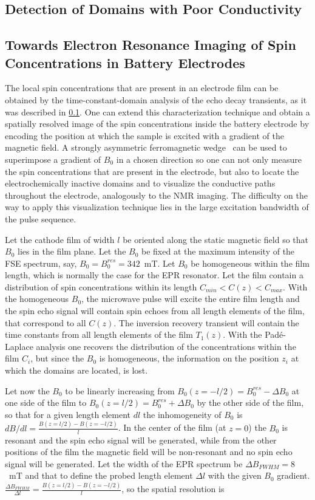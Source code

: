\subsection{Detection of Domains with Poor Conductivity}
\label{sec:domains_distinction_by_relaxation}

\subsection{Towards Electron Resonance Imaging of Spin Concentrations in Battery Electrodes}
The local spin concentrations that are present in an electrode film can be obtained by the time-constant-domain analysis of the echo decay transients, as it was described in \ref{sec:domains_distinction_by_relaxation}. One can extend this characterization technique and obtain a spatially resolved image of the spin concentrations inside the battery electrode by encoding the position at which the sample is excited with a gradient of the magnetic field. A strongly asymmetric ferromagnetic wedge~\cite{SternGerlach1922} can be used to superimpose a gradient of $B_0$ in a chosen direction so one can not only measure the spin concentrations that are present in the electrode, but also to locate the electrochemically inactive domains and to visualize the conductive paths throughout the electrode, analogously to the NMR imaging. The difficulty on the way to apply this visualization technique lies in the large excitation bandwidth of the pulse sequence.
\par
Let the cathode film of width $l$ be oriented along the static magnetic field so that $B_0$ lies in the film plane. Let the $B_0$ be fixed at the maximum intensity of the FSE spectrum, say, $B_0 = B_0^{res}=342$~mT. Let $B_0$ be homogeneous within the film length, which is normally the case for the EPR resonator. Let the film contain a distribution of spin concentrations within its length $C_{min}<C(z)<C_{max}$. With the homogeneous $B_0$, the microwave pulse will excite the entire film length and the spin echo signal will contain spin echoes from all length elements of the film, that correspond to all $C(z)$. The inversion recovery transient will contain the time constants from all length elements of the film $T_1(z)$. With the Pad{\'e}-Laplace analysis one recovers the distribution of the concentrations within the film $C_i$, but since the $B_0$ is homogeneous, the information on the position $z_i$ at which the domains are located, is lost. 
\par
Let now the $B_0$ to be linearly increasing from $B_0(z=-l/2) = B_0^{res}-\Delta B_0$ at one side of the film to $B_0(z=l/2)=B_0^{res}+ \Delta B_0$ by the other side of the film, so that for a given length element $dl$ the inhomogeneity of $B_0$ is $dB/dl = \frac{B(z=l/2)-B(z=-l/2)}{l}$. In the center of the film (at $z=0$) the $B_0$ is resonant and the spin echo signal will be generated, while from the other positions of the film the magnetic field will be non-resonant and no spin echo signal will be generated. Let the width of the EPR spectrum be $\Delta B_{FWHM}=8$~mT and that to define the probed length element $\Delta l$ with the given $B_0$ gradient. $\frac{\Delta B_{FWHM}}{\Delta l} = \frac{B(z=l/2)-B(z=-l/2)}{l}$, so the spatial resolution is 

